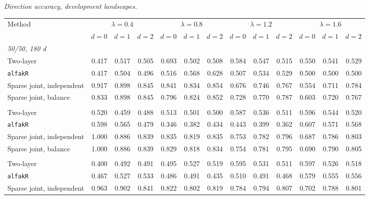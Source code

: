 \noindent\textit{Direction accuracy, development landscapes.}
\begin{center}
\scriptsize
\setlength{\tabcolsep}{2.5pt}
\begin{tabular}{l*{12}{r}}
\toprule
Method & \multicolumn{3}{c}{$\lambda=0.4$} & \multicolumn{3}{c}{$\lambda=0.8$} & \multicolumn{3}{c}{$\lambda=1.2$} & \multicolumn{3}{c}{$\lambda=1.6$} \\
\cmidrule(lr){2-4}\cmidrule(lr){5-7}\cmidrule(lr){8-10}\cmidrule(lr){11-13}
 & $d=0$ & $d=1$ & $d=2$ & $d=0$ & $d=1$ & $d=2$ & $d=0$ & $d=1$ & $d=2$ & $d=0$ & $d=1$ & $d=2$ \\
\midrule
\multicolumn{13}{l}{\textit{50/50, 180 d}} \\
\quad Two-layer & 0.417 & 0.517 & 0.505 & 0.693 & 0.502 & 0.508 & 0.584 & 0.547 & 0.515 & 0.550 & 0.541 & 0.529 \\
\quad \texttt{alfakR} & 0.417 & 0.504 & 0.496 & 0.516 & 0.568 & 0.628 & 0.507 & 0.534 & 0.529 & 0.500 & 0.500 & 0.500 \\
\quad Sparse joint, independent & 0.917 & 0.898 & 0.845 & 0.841 & 0.834 & 0.854 & 0.676 & 0.746 & 0.767 & 0.554 & 0.711 & 0.784 \\
\quad Sparse joint, balance & 0.833 & 0.898 & 0.845 & 0.796 & 0.824 & 0.852 & 0.728 & 0.770 & 0.787 & 0.603 & 0.720 & 0.767 \\
\addlinespace[2pt]
\multicolumn{13}{l}{\textit{200/200, 180 d}} \\
\quad Two-layer & 0.520 & 0.459 & 0.488 & 0.513 & 0.501 & 0.500 & 0.587 & 0.536 & 0.511 & 0.596 & 0.544 & 0.520 \\
\quad \texttt{alfakR} & 0.598 & 0.565 & 0.479 & 0.346 & 0.382 & 0.434 & 0.443 & 0.399 & 0.362 & 0.607 & 0.571 & 0.568 \\
\quad Sparse joint, independent & 1.000 & 0.886 & 0.839 & 0.835 & 0.819 & 0.835 & 0.753 & 0.782 & 0.796 & 0.687 & 0.786 & 0.803 \\
\quad Sparse joint, balance & 1.000 & 0.886 & 0.839 & 0.829 & 0.818 & 0.834 & 0.754 & 0.781 & 0.795 & 0.690 & 0.790 & 0.805 \\
\addlinespace[2pt]
\multicolumn{13}{l}{\textit{200/200, 360 d}} \\
\quad Two-layer & 0.400 & 0.492 & 0.491 & 0.495 & 0.527 & 0.519 & 0.595 & 0.531 & 0.511 & 0.597 & 0.526 & 0.518 \\
\quad \texttt{alfakR} & 0.467 & 0.527 & 0.533 & 0.486 & 0.491 & 0.435 & 0.510 & 0.491 & 0.468 & 0.579 & 0.555 & 0.556 \\
\quad Sparse joint, independent & 0.963 & 0.902 & 0.841 & 0.822 & 0.802 & 0.819 & 0.784 & 0.794 & 0.807 & 0.702 & 0.788 & 0.801 \\

\end{tabular}
\end{center}
